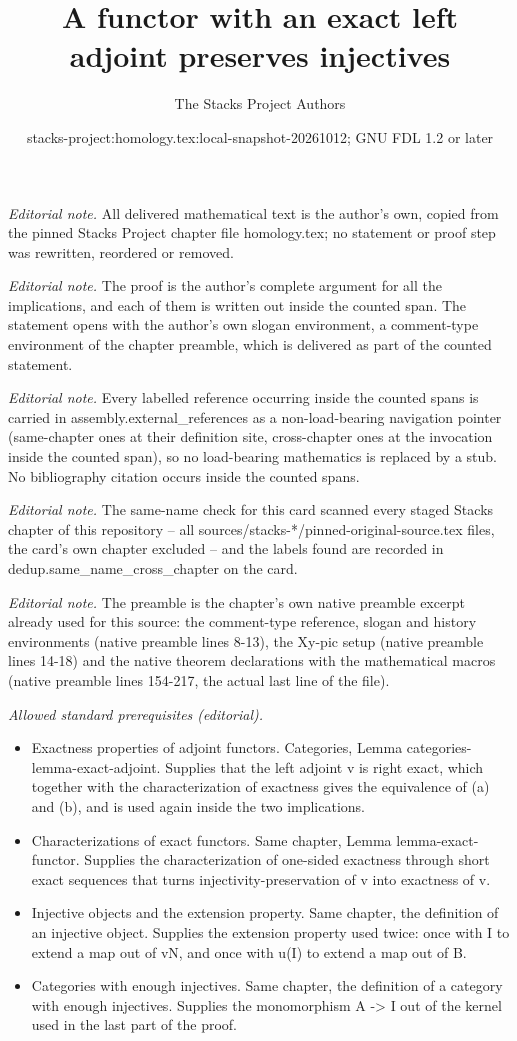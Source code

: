 \documentclass[10pt,a4paper]{amsart}
\title{A functor with an exact left adjoint preserves injectives}
\author{The Stacks Project Authors}
\date{stacks-project:homology.tex:local-snapshot-20261012; GNU FDL 1.2 or later}
\theoremstyle{plain}
\theoremstyle{definition}
\theoremstyle{remark}
\numberwithin{equation}{subsection}
\begin{document}
\maketitle
\noindent\textit{Editorial note.} All delivered mathematical text is the author's own, copied from the pinned Stacks Project chapter file homology.tex; no statement or proof step was rewritten, reordered or removed.\par\medskip
\noindent\textit{Editorial note.} The proof is the author's complete argument for all the implications, and each of them is written out inside the counted span. The statement opens with the author's own slogan environment, a comment-type environment of the chapter preamble, which is delivered as part of the counted statement.\par\medskip
\noindent\textit{Editorial note.} Every labelled reference occurring inside the counted spans is carried in assembly.external\_references as a non-load-bearing navigation pointer (same-chapter ones at their definition site, cross-chapter ones at the invocation inside the counted span), so no load-bearing mathematics is replaced by a stub. No bibliography citation occurs inside the counted spans.\par\medskip
\noindent\textit{Editorial note.} The same-name check for this card scanned every staged Stacks chapter of this repository -- all sources/stacks-*/pinned-original-source.tex files, the card's own chapter excluded -- and the labels found are recorded in dedup.same\_name\_cross\_chapter on the card.\par\medskip
\noindent\textit{Editorial note.} The preamble is the chapter's own native preamble excerpt already used for this source: the comment-type reference, slogan and history environments (native preamble lines 8-13), the Xy-pic setup (native preamble lines 14-18) and the native theorem declarations with the mathematical macros (native preamble lines 154-217, the actual last line of the file).\par\medskip
\noindent\textit{Allowed standard prerequisites (editorial).}\begin{itemize}
\item Exactness properties of adjoint functors. Categories, Lemma categories-lemma-exact-adjoint. Supplies that the left adjoint v is right exact, which together with the characterization of exactness gives the equivalence of (a) and (b), and is used again inside the two implications.
\item Characterizations of exact functors. Same chapter, Lemma lemma-exact-functor. Supplies the characterization of one-sided exactness through short exact sequences that turns injectivity-preservation of v into exactness of v.
\item Injective objects and the extension property. Same chapter, the definition of an injective object. Supplies the extension property used twice: once with I to extend a map out of vN, and once with u(I) to extend a map out of B.
\item Categories with enough injectives. Same chapter, the definition of a category with enough injectives. Supplies the monomorphism A -> I out of the kernel used in the last part of the proof.
\end{itemize}\medskip
\end{document}
